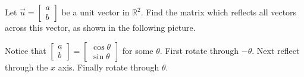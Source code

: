 \documentclass{ximera}
\begin{document}
\begin{problem}\label{prb:6.26} Let $\vec{u}=\left[
\begin{array}{r}
a \\
b
\end{array}
\right] $ be a unit vector in $\mathbb{R}^{2}.$ Find the matrix
 which reflects all vectors across
this vector, as shown in the following picture.

\begin{center}
\end{center}

\begin{hint}
Notice that $\left[
\begin{array}{r}
a \\
b
\end{array}
\right] =\left[
\begin{array}{c}
\cos \theta  \\
\sin \theta
\end{array}
\right] $ for some $\theta .$ First rotate through $-\theta .$ Next reflect through the $x$ axis. Finally rotate
through $\theta $.


\end{hint}
\end{problem}
\end{document}
